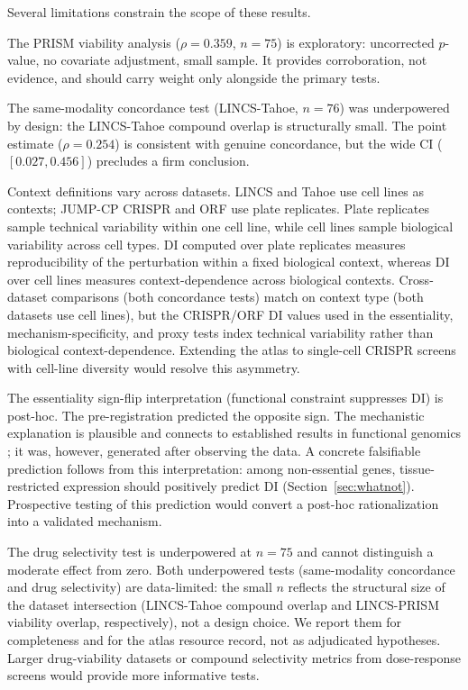 \documentclass[11pt]{article}
\begin{document}
Several limitations constrain the scope of these results.

The PRISM viability analysis ($\rho = 0.359$, $n = 75$) is exploratory:
uncorrected $p$-value, no covariate adjustment, small sample.  It
provides corroboration, not evidence, and should carry weight only
alongside the primary tests.

The same-modality concordance test (LINCS-Tahoe, $n = 76$) was underpowered by design: the
LINCS-Tahoe compound overlap is structurally small.  The point estimate
($\rho = 0.254$) is consistent with genuine concordance, but the wide CI
($[0.027, 0.456]$) precludes a firm conclusion.

Context definitions vary across datasets.  LINCS and Tahoe use cell
lines as contexts; JUMP-CP CRISPR and ORF use plate replicates.  Plate
replicates sample technical variability within one cell line, while cell
lines sample biological variability across cell types.  DI computed over
plate replicates measures reproducibility of the perturbation within a
fixed biological context, whereas DI over cell lines measures
context-dependence across biological contexts.  Cross-dataset
comparisons (both concordance tests) match on context type (both
datasets use cell lines), but the CRISPR/ORF DI values used in the
essentiality, mechanism-specificity, and proxy tests index technical
variability rather than biological
context-dependence.  Extending the atlas to single-cell CRISPR screens
with cell-line diversity \citep{tahoe2025} would resolve this
asymmetry.

The essentiality sign-flip interpretation (functional constraint
suppresses DI) is post-hoc.  The pre-registration predicted the
opposite sign.  The mechanistic explanation is plausible and connects to
established results in functional genomics
\citep{funk2022phenotypic, ramezani2025periscope}; it was, however,
generated after observing the data.  A concrete falsifiable prediction
follows from this interpretation: among non-essential genes,
tissue-restricted expression should positively predict DI
(Section~\ref{sec:whatnot}).  Prospective testing of this prediction
would convert a post-hoc rationalization into a validated mechanism.

The drug selectivity test is underpowered at $n = 75$ and cannot
distinguish a moderate effect from zero.  Both underpowered tests
(same-modality concordance and drug selectivity) are data-limited: the small $n$ reflects the structural size of
the dataset intersection (LINCS-Tahoe compound overlap and LINCS-PRISM
viability overlap, respectively), not a design choice.  We report them
for completeness and for the atlas resource record, not as adjudicated
hypotheses.  Larger drug-viability datasets or compound selectivity
metrics from dose-response screens would provide more informative tests.
\end{document}
